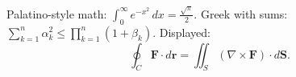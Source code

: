\documentclass{article}
\begin{document}
Palatino-style math: $\int_0^\infty e^{-x^2}\,dx = \frac{\sqrt{\pi}}{2}$.
Greek with sums: $\sum_{k=1}^n \alpha_k^2 \le \prod_{k=1}^n (1+\beta_k)$.
Displayed: \[ \oint_C \mathbf{F}\cdot d\mathbf{r} = \iint_S (\nabla\times\mathbf{F})\cdot d\mathbf{S}. \]
\end{document}
